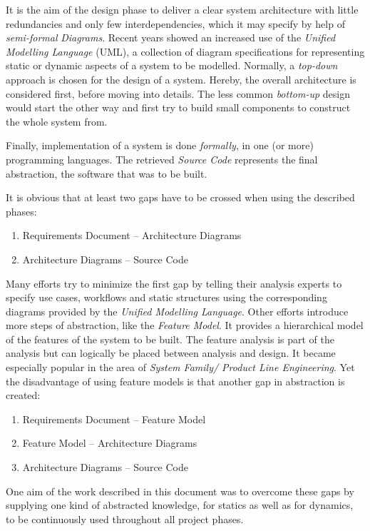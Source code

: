 It is the aim of the design phase to deliver a clear system architecture with
little redundancies and only few interdependencies, which it may specify by help
of \emph{semi-formal} \emph{Diagrams}. Recent years showed an increased use of the
\emph{Unified Modelling Language} (UML), a collection of diagram specifications
for representing static or dynamic aspects of a system to be modelled.
Normally, a \emph{top-down} approach is chosen for the design of a system.
Hereby, the overall architecture is considered first, before moving into details.
The less common \emph{bottom-up} design would start the other way and first try
to build small components to construct the whole system from.

Finally, implementation of a system is done \emph{formally}, in one (or more)
programming languages. The retrieved \emph{Source Code} represents the final
abstraction, the software that was to be built.

It is obvious that at least two gaps have to be crossed when using the described
phases:

\begin{enumerate}
    \item{Requirements Document -- Architecture Diagrams}
    \item{Architecture Diagrams -- Source Code}
\end{enumerate}

Many efforts try to minimize the first gap by telling their analysis experts
to specify use cases, workflows and static structures using the corresponding
diagrams provided by the \emph{Unified Modelling Language}.
Other efforts introduce more steps of abstraction, like the \emph{Feature Model}.
It provides a hierarchical model of the features of the system to be built.
The feature analysis is part of the analysis but can logically be placed between
analysis and design. It became especially popular in the area of
\emph{System Family/ Product Line Engineering}. Yet the disadvantage of using
feature models is that another gap in abstraction is created:

\begin{enumerate}
    \item{Requirements Document -- Feature Model}
    \item{Feature Model -- Architecture Diagrams}
    \item{Architecture Diagrams -- Source Code}
\end{enumerate}

One aim of the work described in this document was to overcome these gaps by
supplying one kind of abstracted knowledge, for statics as well as for dynamics,
to be continuously used throughout all project phases.
